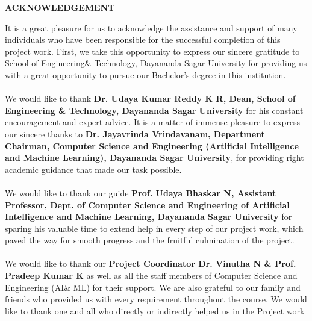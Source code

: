 \documentclass[ 12pt,a4paper,twocolumn,fleqn]{report}
\begin{document}
\newpage
  \pagestyle{plain}
\thisfancypage{%
  \setlength{\fboxsep}{20pt}\doublebox}{}
\begin{center}
\huge\textbf{ACKNOWLEDGEMENT}
\end{center}
\vspace{15mm}
\normalsize
It is a great pleasure for us to acknowledge the assistance and support of many individuals who have been responsible for the successful completion of this project work.
First, we take this opportunity to express our sincere gratitude to School of Engineering\& Technology, Dayananda Sagar University for providing us with a great opportunity to pursue our Bachelor’s degree in this institution.
\\
\hfill
\\
We would like to thank \textbf{ Dr. Udaya Kumar Reddy K R, Dean, School of Engineering \&
Technology, Dayananda Sagar University }for his constant encouragement and expert advice.
It is a matter of immense pleasure to express our sincere thanks to\textbf{ Dr. Jayavrinda
Vrindavanam, Department Chairman, Computer Science and Engineering (Artificial
Intelligence and Machine Learning), Dayananda Sagar University}, for providing right academic guidance that made our task possible.
\\
\hfill
\\
We would like to thank our guide  \textbf{Prof. Udaya Bhaskar N, Assistant Professor, Dept. of
Computer Science and Engineering of Artificial Intelligence and Machine Learning, Dayananda Sagar University} for sparing his valuable time to extend help in every step of our
project work, which paved the way for smooth progress and the fruitful culmination of the project.
\\
\hfill
\\
We would like to thank our \textbf{Project Coordinator Dr. Vinutha N \& Prof. Pradeep Kumar K} as well as all the staff members
of Computer Science and Engineering (AI\& ML) for their support.
We are also grateful to our family and friends who provided us with every requirement
throughout the course.
We would like to thank one and all who directly or indirectly helped us in the Project work


\newpage
  \pagestyle{fancy}
\thisfancypage{%
  \setlength{\fboxsep}{20pt}\doublebox}{}
\tableofcontents{\protect\enlargethispage*{\baselineskip}}
\end{document}
